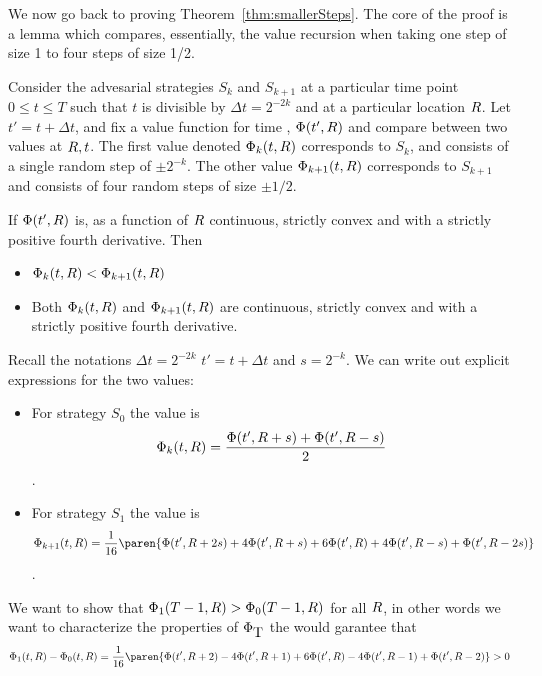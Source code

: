 \documentclass{article}[12pt]
\begin{document}
We now go back to proving Theorem~\ref{thm:smallerSteps}. The core of
the proof is a lemma which compares, essentially, the value recursion
when taking one step of size 1 to four steps of size 1/2.

\newcommand{\deltat}{\Delta t}

Consider the advesarial strategies $S_k$ and $S_{k+1}$ at a particular
time point $0 \leq t \leq T$ such that $t$ is divisible by
$\deltat=2^{-2k}$ and at a particular location $R$. Let
$t'=t+\deltat$, and fix a value
function for time , $\Phi(t',R)$ and compare between
two values at $R,t$. The first value denoted
$\Phi_k(t,R)$ corresponds to $S_k$, and consists of a single random step of $\pm 2^{-k}$. 
The other value $\Phi_{k+1}(t,R)$ corresponds to $S_{k+1}$ and consists of
four random steps of size $\pm 1/2$.

\begin{lemma} \label{lemma:n-strictly-convex}
If $\Phi(t',R)$ is, as a function of $R$ continuous, strictly
convex and with a strictly positive fourth derivative. Then
\begin{itemize}
\item $\Phi_k(t,R) < \Phi_{k+1}(t,R)$
  \item Both $\Phi_k(t,R)$ and $\Phi_{k+1}(t,R)$ are continuous, strictly
convex and with a strictly positive fourth derivative.
\end{itemize}
\end{lemma}

\proof
Recall the notations $\deltat = 2^{-2k}$ $t' = t+\deltat$ and $s=2^{-k}$.
We can write out explicit expressions for the two values:
\begin{itemize}
\item For strategy $S_0$ the value is
  $$\Phi_k(t, R) = \frac{\Phi(t',R+s)+ \Phi(t',R-s)}{2} $$.
\item For strategy $S_1$ the value is
  $$\pot_{k+1}(t, \R) = \frac{1}{16}
  \paren{\pot(t',\R+2s)+ 4\pot(t',\R+s)+ 6\pot(t',\R)+  4\pot(t',\R-s)+ \pot(t',\R-2s)}
  $$.
\end{itemize}

We want to show that $\Phi_1(T-1,R) > \Phi_0(T-1,R)$ for all $R$, in
other words we want to characterize the properties of $\Phi_{\mbox{T}}$ the
would garantee that
\begin{equation}\label{eqn:4thOrderConvex}
\pot_1(t,\R) - \pot_0(t,\R) =
\frac{1}{16}
\paren{ \pot(t',\R+2) - 4\pot(t',\R+1) +6\pot(t',\R) - 4\pot(t',\R-1) +\pot(t',\R-2)} > 0
\end{equation}
\end{document}
